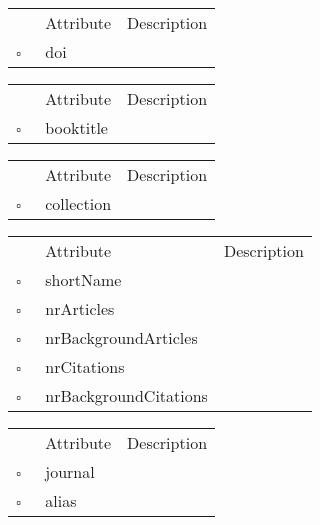 \begin{table}
\caption{DoiReference  }

\begin{longtable}{llp{8cm}}
& Attribute & Description \\
$\square$\ & doi &  \\
\end{longtable}
\label{attr:DoiReference}
\end{table}

\begin{table}
\caption{InBook  }

\begin{longtable}{llp{8cm}}
& Attribute & Description \\
$\square$\ & booktitle &  \\
\end{longtable}
\label{attr:InBook}
\end{table}

\begin{table}
\caption{InCollection  }

\begin{longtable}{llp{8cm}}
& Attribute & Description \\
$\square$\ & collection &  \\
\end{longtable}
\label{attr:InCollection}
\end{table}

\begin{table}
\caption{Journal  }

\begin{longtable}{llp{8cm}}
& Attribute & Description \\
$\square$\ & shortName &  \\
$\square$\ & nrArticles &  \\
$\square$\ & nrBackgroundArticles &  \\
$\square$\ & nrCitations &  \\
$\square$\ & nrBackgroundCitations &  \\
\end{longtable}
\label{attr:Journal}
\end{table}

\clearpage
\begin{table}
\caption{JournalAlias  }

\begin{longtable}{llp{8cm}}
& Attribute & Description \\
$\square$\ & journal &  \\
$\square$\ & alias &  \\
\end{longtable}
\label{attr:JournalAlias}
\end{table}


